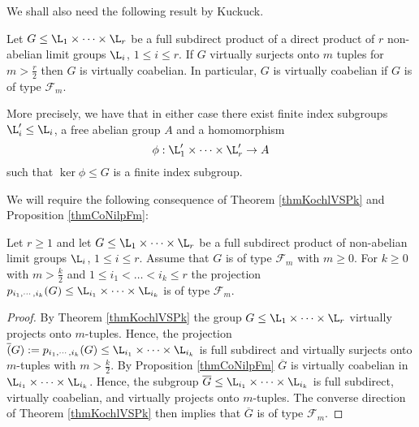 We shall also need the following result by Kuckuck.

\begin{proposition}
 Let $G\leq \L_1 \times \cdots \times \L_r$ be a full subdirect product of a direct product of $r$ non-abelian limit groups $\L_i$, $1\leq i \leq r$. If $G$ virtually surjects onto $m$ tuples for $m> \frac{r}{2}$ then $G$ is virtually coabelian. In particular, $G$ is virtually coabelian if $G$ is of type $\mathcal{F}_m$. 
 
 More precisely, we have that in either case there exist finite index subgroups $\L'_i\leq \L_i$, a free abelian group $A$ and a homomorphism
 \[
 \phi: \L'_1\times \cdots \times \L'_r \rightarrow A
 \]
such that $\ker \phi\leq G$ is a finite index subgroup.
\label{thmCoNilpFm}
\end{proposition}

We will require the following consequence of Theorem \ref{thmKochlVSPk} and Proposition \ref{thmCoNilpFm}:
\begin{corollary}
\label{corFinPropsProjFactors}
 Let $r\geq 1$ and let $G\leq \L_1 \times \cdots \times \L_r$ be a full subdirect product of non-abelian limit groups $\L_i$, $1\leq i \leq r$. Assume that $G$ is of type $\mathcal{F}_m$ with $m\geq 0$. For $k\geq 0$ with $m>\frac{k}{2}$ and $1\leq i_1 < \dots < i_k\leq r$ the projection $p_{i_1,\cdots,i_k}(G)\leq \L_{i_1}\times \dots \times \L_{i_k}$ is of type $\mathcal{F}_m$.
\end{corollary}
\begin{proof}
 By Theorem \ref{thmKochlVSPk} the group $G\leq \L_1 \times \cdots \times \L_r$ virtually projects onto $m$-tuples. Hence, the projection $\overline(G):=p_{i_1,\cdots,i_k}(G)\leq \L_{i_1}\times \cdots \times \L_{i_k}$ is full subdirect and virtually surjects onto $m$-tuples with $m> \frac{k}{2}$. By Proposition \ref{thmCoNilpFm} $\overline{G}$ is virtually coabelian in $\L_{i_1}\times \cdots \times \L_{i_k}$. Hence, the subgroup $\overline{G}\leq \L_{i_1}\times \cdots \times \L_{i_k}$ is full subdirect, virtually coabelian, and virtually projects onto $m$-tuples. The converse direction of Theorem \ref{thmKochlVSPk} then implies that $\overline{G}$ is of type $\mathcal{F}_m$.
\end{proof}

